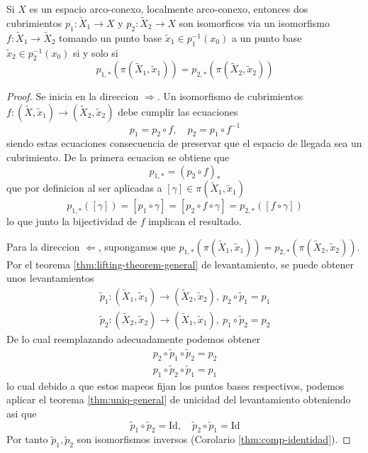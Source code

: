 \begin{teorema}\label{thm:exists-isomor}
  Si \(X\) es un espacio arco-conexo, localmente arco-conexo, entonces
  dos cubrimientos \(p_1 : \tilde X _1 \to X\) y \(p_2 : \tilde X _2 \to
  X\) son isomorficos via un isomorfismo \(f : \tilde X_1 \to \tilde
  X_2\) tomando un punto base \(\tilde x_1 \in p_1^{-1} (x_0)\) a un
  punto base \(\tilde x_2 \in p_2^{-1} (x_0)\) si y solo si
  \[ p_{1,*} \left( \pi (\tilde X _1, \tilde x _1) \right) = p_{2,*}
    \left( \pi (\tilde X _2, \tilde x _2) \right) \]
\end{teorema}
\begin{proof}
  Se inicia en la direccion \(\Rightarrow\). Un isomorfismo de cubrimientos
  \(f : (\tilde X , \tilde x _1) \to (\tilde X _2, \tilde x _2)\) debe
  cumplir las ecuaciones
  \[ p_1 = p_2 \circ f,\quad p_2 = p_1 \circ f^{-1} \]
  siendo estas ecuaciones consecuencia de preservar que el espacio de
  llegada sea un cubrimiento. De la primera ecuacion se obtiene que
  \[ p_{1,*} = \left( p_2 \circ f \right)_* \]
  que por definicion al ser aplicadas a \([\gamma] \in \pi (\tilde X_1,
  \tilde x_1)\)
  \begin{equation*}
      p_{1,*} \left( [\gamma] \right) = [p_1 \circ \gamma] = [p_2 \circ
      f \circ \gamma ] = p_{2,*} \left( [f \circ \gamma] \right)
  \end{equation*}
  lo que junto la bijectividad de \(f\) implican el resultado.

  Para la direccion \(\Leftarrow\), supongamos que \(p_{1,*} (\pi
  (\tilde X _1 , \tilde x _1)) = p_{2,*} (\pi
  (\tilde X _2 , \tilde x _2))\). Por el teorema
  \ref{thm:lifting-theorem-general} de levantamiento, se puede obtener
  unos levantamientos
  \begin{gather*}
    \tilde p _1 : (\tilde X _1 , \tilde x _1) \to (\tilde X_2 , \tilde
    x_2), \ p_2 \circ \tilde p_1 = p_1 \\
    \tilde p _2 : (\tilde X _2 , \tilde x _2) \to (\tilde X_1 , \tilde
    x_1), \ p_1 \circ \tilde p_2 = p_2
  \end{gather*}
  De lo cual reemplazando adecuadamente podemos obtener
  \begin{gather*}
    p_2 \circ \tilde p _1 \circ \tilde p _2 = p_2 \\
    p_1 \circ \tilde p _2 \circ \tilde p _1 = p_1
  \end{gather*}
  lo cual debido a que estos mapeos fijan los puntos bases respectivos,
  podemos aplicar el teorema \ref{thm:uniq-general} de unicidad
  del levantamiento obteniendo asi que
  \[ \tilde p_1 \circ \tilde p_2 = \text{Id}, \quad \tilde p_2 \circ
    \tilde p_1 = \text{Id} \]
  Por tanto \(\tilde p_1 , \tilde p_2\) son isomorfismos inversos
  (Corolario \ref{thm:comp-identidad}).
\end{proof}

